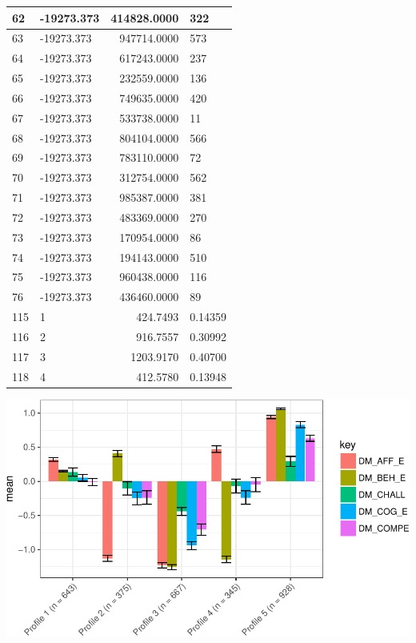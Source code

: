 \documentclass[]{book}
\theoremstyle{definition}
\theoremstyle{definition}
\theoremstyle{definition}
\theoremstyle{remark}
\begin{document}
\begin{tabular}{l|l|r|l}
\hline
62 & -19273.373 & 414828.0000 & 322\\
\hline
63 & -19273.373 & 947714.0000 & 573\\
\hline
64 & -19273.373 & 617243.0000 & 237\\
\hline
65 & -19273.373 & 232559.0000 & 136\\
\hline
66 & -19273.373 & 749635.0000 & 420\\
\hline
67 & -19273.373 & 533738.0000 & 11\\
\hline
68 & -19273.373 & 804104.0000 & 566\\
\hline
69 & -19273.373 & 783110.0000 & 72\\
\hline
70 & -19273.373 & 312754.0000 & 562\\
\hline
71 & -19273.373 & 985387.0000 & 381\\
\hline
72 & -19273.373 & 483369.0000 & 270\\
\hline
73 & -19273.373 & 170954.0000 & 86\\
\hline
74 & -19273.373 & 194143.0000 & 510\\
\hline
75 & -19273.373 & 960438.0000 & 116\\
\hline
76 & -19273.373 & 436460.0000 & 89\\
\hline
115 & 1 & 424.7493 & 0.14359\\
\hline
116 & 2 & 916.7557 & 0.30992\\
\hline
117 & 3 & 1203.9170 & 0.40700\\
\hline
118 & 4 & 412.5780 & 0.13948\\
\hline
\end{tabular}

\begin{center}\includegraphics[width=0.8\linewidth]{rosenberg-dissertation_files/figure-latex/spec-solutions-m1_5-1} \end{center}
\end{document}
